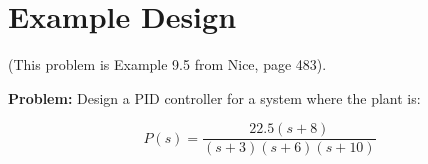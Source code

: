 %
%
%
%
%
%



\section{Example Design}


(This problem is Example 9.5 from Nice, page 483).


{\bf Problem: }
Design a PID controller for a system where the plant is:

\[
P(s) = \frac{22.5(s+8)}{(s+3)(s+6)(s+10)}
\]

